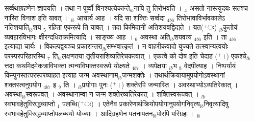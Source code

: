 \documentclass[article,12pt,a4paper]{memoir}%
\newcommand{\add}[1]{($^{+}$#1)}
\newcounter{parCount}
\begin{document}
सर्व्वथाग्रहणेन ज्ञापयति । तथा न पूर्व्वो विनश्यत्येकान्ते{\tiny $_{lb}$}नापि तु तिरोभवति । {\tiny $_{4}$} असतो नास्त्युदयः सतश्च नास्ति विनाश इति यावत् । {\tiny $_{lb}$} \leavevmode{} आचार्य आह । {\color{DodgerBlue3}यदि सा शक्तिः सर्व्वदा} {\tiny $_{4b6}$} तिरोभावाविर्भावकालेऽ {\color{DodgerBlue3}नतिशयाति{\tiny $_{lb}$}शय {\tiny $_{5}$} रहिता एकरूपे} ति यावत् । तदा {\color{DodgerBlue3}किमिदानीं} अतिशयवद्विद्यते । यत\add{ः} {\tiny $_{lb}$}कुतोयं व्यवहारविभागः क्षीरन्दधितक्रमित्यादि । {\color{DodgerBlue3}साङ्ख्य} आह । {\tiny $_{6}$} अवस्था {\color{DodgerBlue3}अति{\tiny $_{lb}$}शयवत्य} {\tiny $_{4b6}$} इति । {\color{DodgerBlue3}ता} {\tiny $_{4b6}$} इत्याद्या {\color{DodgerBlue3}चार्यः} । विकल्पद्वयञ्च प्रकारान्तरा{\tiny $_{lb}$}सम्भवात्कृतं । न वाहरीकवादो युज्यते तत्स्वान्यत्वयोः परस्परपरिहारस्थि {\tiny $_{7}$} ति{\tiny $_{lb}$}लक्षणतया तृतीयराशिव्यतिरेचकत्वात् । एकत्वे को दोष इति चेदाह \add{।} {\color{DodgerBlue3}एकश्चे{\tiny $_{lb}$}त्तदा कथमिदमेकत्राविभक्ता} त्मन्यविभक्तस्वरूपे {\color{DodgerBlue3}योक्ष्यते} {\tiny $_{4b7}$} । व्यपेक्षया {\tiny $_{lb}$}भ {\tiny $_{8}$} वेदपीत्याह । {\color{DodgerBlue3}निष्पर्यायं} किम्पुनस्तत्परस्परव्याहत इत्याह {\color{DodgerBlue3}जन्म अवस्थानाम{\tiny $_{lb}$}जन्मशक्तेः} । तथार्थक्रियायामुपयोगोऽवस्थानां शक्तस्त्वनुपयोग {\tiny $_{4b7}$} इ {\tiny $_{9}$} \leavevmode{} ति । {\tiny $_{lb}$}प्रयोगाः पुनः \add{।} शक्तेरपि जन्मास्ति । अवस्थाभ्योऽव्यतिरेकात् । अवस्था{\tiny $_{lb}$}स्वरूपवत् । अवस्थानाम्वा न जन्म शक्तेरव्यतिरेकात् । शक्तिस्वरूपवत् । {\tiny $_{lb}$}स्वभावहेतुविरुद्धव्याप्तो {\tiny $_{1}$} पलब्धि\add{ः} । एतेनैव प्रकारेणार्थक्रियोपयोगानुपयोगनिवृत्य{\tiny $_{lb}$}निवृत्यादिषु स्वभावहेतुविरुद्धव्याप्तोपलब्धयो योज्याः । आदिग्रहणेन पतनापतन{\tiny $_{lb}$}पोरपि परिग्रहः ।
	{}
	\pend%
      {\tiny $_{lb}$}
\end{document}
